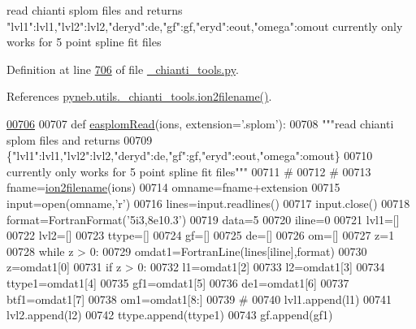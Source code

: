 \begin{DoxyVerb}read chianti splom files and returns
{"lvl1":lvl1,"lvl2":lvl2,"deryd":de,"gf":gf,"eryd":eout,"omega":omout}
currently only works for 5 point spline fit files\end{DoxyVerb}
 

Definition at line \hyperlink{__chianti__tools_8py_source_l00706}{706} of file \hyperlink{__chianti__tools_8py_source}{\-\_\-chianti\-\_\-tools.\-py}.



References \hyperlink{__chianti__tools_8py_source_l00396}{pyneb.\-utils.\-\_\-chianti\-\_\-tools.\-ion2filename()}.


\begin{DoxyCode}
\hypertarget{namespacepyneb_1_1utils_1_1__chianti__tools_l00706}{}\hyperlink{namespacepyneb_1_1utils_1_1__chianti__tools_aa36b22e4e67bccdea3436dcc05e7ba5b}{00706} 
00707 \textcolor{keyword}{def }\hyperlink{namespacepyneb_1_1utils_1_1__chianti__tools_aa36b22e4e67bccdea3436dcc05e7ba5b}{easplomRead}(ions, extension='.splom'):
00708     \textcolor{stringliteral}{"""read chianti splom files and returns}
00709 \textcolor{stringliteral}{    \{"lvl1":lvl1,"lvl2":lvl2,"deryd":de,"gf":gf,"eryd":eout,"omega":omout\}}
00710 \textcolor{stringliteral}{    currently only works for 5 point spline fit files"""}
00711     \textcolor{comment}{#}
00712     \textcolor{comment}{#}
00713     fname=\hyperlink{namespacepyneb_1_1utils_1_1__chianti__tools_a7748521ca99103785680d691667ce851}{ion2filename}(ions)
00714     omname=fname+extension
00715     input=open(omname,\textcolor{stringliteral}{'}\textcolor{stringliteral}{r')}
00716 \textcolor{stringliteral}{    lines=input.readlines()}
00717 \textcolor{stringliteral}{    input.close()}
00718 \textcolor{stringliteral}{    format=FortranFormat(}\textcolor{stringliteral}{'5i3,8e10.3'})
00719     data=5
00720     iline=0
00721     lvl1=[]
00722     lvl2=[]
00723     ttype=[]
00724     gf=[]
00725     de=[]
00726     om=[]
00727     z=1
00728     \textcolor{keywordflow}{while} z > 0:
00729         omdat1=FortranLine(lines[iline],format)
00730         z=omdat1[0]
00731         \textcolor{keywordflow}{if} z > 0:
00732             l1=omdat1[2]
00733             l2=omdat1[3]
00734             ttype1=omdat1[4]
00735             gf1=omdat1[5]
00736             de1=omdat1[6]
00737             btf1=omdat1[7]
00738             om1=omdat1[8:]
00739             \textcolor{comment}{#}
00740             lvl1.append(l1)
00741             lvl2.append(l2)
00742             ttype.append(ttype1)
00743             gf.append(gf1)

\end{DoxyCode}
